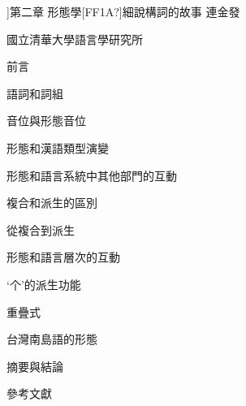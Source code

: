 
]{\rmfamily 第二章 形態學[FF1A?]細說構詞的故事}
\rmfamily
連金發

\rmfamily
國立清華大學語言學研究所

\begin{listWWviiiNumxleveli}
\item \begin{styleqwerty}\rmfamily
前言
\end{styleqwerty}
\item \begin{styleqwerty}\rmfamily
語詞和詞組
\end{styleqwerty}
\item \begin{styleqwerty}\rmfamily
音位與形態音位
\end{styleqwerty}
\item \begin{styleqwerty}\rmfamily
形態和漢語類型演變
\end{styleqwerty}
\item \begin{styleqwerty}\rmfamily
形態和語言系統中其他部門的互動
\end{styleqwerty}
\item \begin{styleqwerty}\rmfamily
複合和派生的區別
\end{styleqwerty}
\item \begin{styleqwerty}\rmfamily
從複合到派生
\end{styleqwerty}
\item \begin{styleqwerty}\rmfamily
形態和語言層次的互動
\end{styleqwerty}
\item \begin{styleqwerty}\rmfamily
‘个’的派生功能
\end{styleqwerty}
\item \begin{styleqwerty}\rmfamily
重疊式
\end{styleqwerty}
\item \begin{styleqwerty}\rmfamily
台灣南島語的形態
\end{styleqwerty}
\item \begin{styleqwerty}\rmfamily
摘要與結論
\end{styleqwerty}
\item \begin{styleqwerty}\rmfamily
參考文獻
\end{styleqwerty}
\end{listWWviiiNumxleveli}

